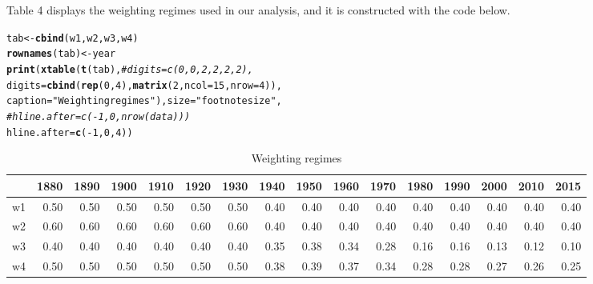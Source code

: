 \documentclass[11pt]{article}\usepackage[]{graphicx}\usepackage[]{color}
\makeatletter
\newcommand{\hlnum}[1]{\textcolor[rgb]{0.686,0.059,0.569}{#1}}%
\newcommand{\hlstr}[1]{\textcolor[rgb]{0.192,0.494,0.8}{#1}}%
\newcommand{\hlcom}[1]{\textcolor[rgb]{0.678,0.584,0.686}{\textit{#1}}}%
\newcommand{\hlopt}[1]{\textcolor[rgb]{0,0,0}{#1}}%
\newcommand{\hlstd}[1]{\textcolor[rgb]{0.345,0.345,0.345}{#1}}%
\newcommand{\hlkwb}[1]{\textcolor[rgb]{0.69,0.353,0.396}{#1}}%
\newcommand{\hlkwc}[1]{\textcolor[rgb]{0.333,0.667,0.333}{#1}}%
\newcommand{\hlkwd}[1]{\textcolor[rgb]{0.737,0.353,0.396}{\textbf{#1}}}%
\newenvironment{kframe}{%
 \def\at@end@of@kframe{}%
 \ifinner\ifhmode%
  \def\at@end@of@kframe{\end{minipage}}%
  \begin{minipage}{\columnwidth}%
 \fi\fi%
 \def\FrameCommand##1{\hskip\@totalleftmargin \hskip-\fboxsep
 \colorbox{shadecolor}{##1}\hskip-\fboxsep
     \hskip-\linewidth \hskip-\@totalleftmargin \hskip\columnwidth}%
 \MakeFramed {\advance\hsize-\width
   \@totalleftmargin\z@ \linewidth\hsize
   \@setminipage}}%
 {\par\unskip\endMakeFramed%
 \at@end@of@kframe}
\makeatother
\begin{document}
Table 4 displays the weighting regimes used in our analysis, and it is 
constructed with the code below.

\begin{kframe}
\begin{alltt}
\hlstd{tab} \hlkwb{<-} \hlkwd{cbind}\hlstd{(w1,w2,w3,w4)}
\hlkwd{rownames}\hlstd{(tab)} \hlkwb{<-} \hlstd{year}
\hlkwd{print}\hlstd{(}\hlkwd{xtable}\hlstd{(}\hlkwd{t}\hlstd{(tab),} \hlcom{#digits = c(0,0,2,2,2,2), }
  \hlkwc{digits} \hlstd{=} \hlkwd{cbind}\hlstd{(}\hlkwd{rep}\hlstd{(}\hlnum{0}\hlstd{,} \hlnum{4}\hlstd{),} \hlkwd{matrix}\hlstd{(}\hlnum{2}\hlstd{,} \hlkwc{ncol} \hlstd{=} \hlnum{15}\hlstd{,} \hlkwc{nrow} \hlstd{=} \hlnum{4}\hlstd{)),}
  \hlkwc{caption} \hlstd{=} \hlstr{"Weighting regimes"}\hlstd{),} \hlkwc{size} \hlstd{=} \hlstr{"footnotesize"}\hlstd{,}
  \hlcom{#hline.after = c(-1,0,nrow(data)))}
  \hlkwc{hline.after} \hlstd{=} \hlkwd{c}\hlstd{(}\hlopt{-}\hlnum{1}\hlstd{,}\hlnum{0}\hlstd{,}\hlnum{4}\hlstd{))}
\end{alltt}
\end{kframe}%
\begin{table}[ht]
\centering
\begingroup\footnotesize
\begin{tabular}{rrrrrrrrrrrrrrrr}
  \hline
 & 1880 & 1890 & 1900 & 1910 & 1920 & 1930 & 1940 & 1950 & 1960 & 1970 & 1980 & 1990 & 2000 & 2010 & 2015 \\ 
  \hline
w1 & 0.50 & 0.50 & 0.50 & 0.50 & 0.50 & 0.50 & 0.40 & 0.40 & 0.40 & 0.40 & 0.40 & 0.40 & 0.40 & 0.40 & 0.40 \\ 
  w2 & 0.60 & 0.60 & 0.60 & 0.60 & 0.60 & 0.60 & 0.40 & 0.40 & 0.40 & 0.40 & 0.40 & 0.40 & 0.40 & 0.40 & 0.40 \\ 
  w3 & 0.40 & 0.40 & 0.40 & 0.40 & 0.40 & 0.40 & 0.35 & 0.38 & 0.34 & 0.28 & 0.16 & 0.16 & 0.13 & 0.12 & 0.10 \\ 
  w4 & 0.50 & 0.50 & 0.50 & 0.50 & 0.50 & 0.50 & 0.38 & 0.39 & 0.37 & 0.34 & 0.28 & 0.28 & 0.27 & 0.26 & 0.25 \\ 
   \hline
\end{tabular}
\endgroup
\caption{Weighting regimes} 
\end{table}
\end{document}
